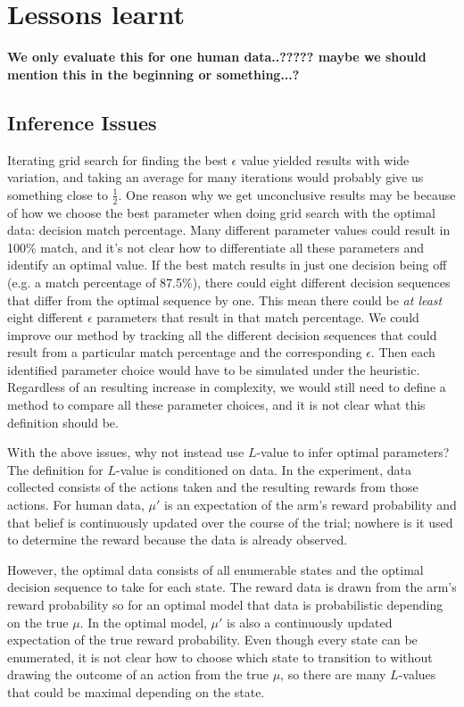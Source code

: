 \section{Lessons learnt}

\textbf{We only evaluate this for one human data..????? maybe we should mention this in the beginning or something...?}

\subsection{Inference Issues}
Iterating grid search for finding the best $\epsilon$ value yielded results with wide variation, and taking an average for many iterations would probably give us something close to $\frac{1}{2}$. One reason why we get unconclusive results may be because of how we choose the best parameter when doing grid search with the optimal data: decision match percentage. Many different parameter values could result in 100\% match, and it's not clear how to differentiate all these parameters and identify an optimal value. If the best match results in just one decision being off (e.g. a match percentage of 87.5\%), there could eight different decision sequences that differ from the optimal sequence by one. This mean there could be \textit{at least} eight different $\epsilon$ parameters that result in that match percentage. We could improve our method by tracking all the different decision sequences that could result from a particular match percentage and the corresponding $\epsilon$. Then each identified parameter choice would have to be simulated under the heuristic. Regardless of an resulting increase in complexity, we would still need to define a method to compare all these parameter choices, and it is not clear what this definition should be.

With the above issues, why not instead use $L$-value to infer optimal parameters? The definition for $L$-value is conditioned on data. In the experiment, data collected consists of the actions taken and the resulting rewards from those actions. For human data, $\mu'$ is an expectation of the arm's reward probability and that belief is continuously updated over the course of the trial; nowhere is it used to determine the reward because the data is already observed. 

However, the optimal data consists of all enumerable states and the optimal decision sequence to take for each state. The reward data is drawn from the arm's reward probability so for an optimal model that data is probabilistic depending on the true $\mu$. In the optimal model, $\mu'$ is also a continuously updated expectation of the true reward probability. Even though every state can be enumerated, it is not clear how to choose which state to transition to without drawing the outcome of an action from the true $\mu$, so there are many $L$-values that could be maximal depending on the state.


